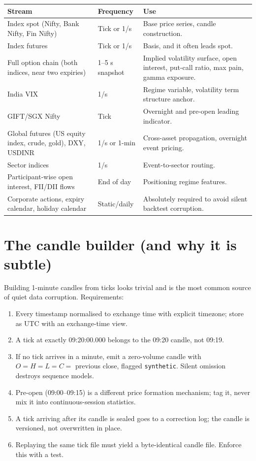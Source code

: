 \begin{longtable}{@{}p{4.0cm}p{3.2cm}p{7.0cm}@{}}
\toprule
\textbf{Stream} & \textbf{Frequency} & \textbf{Use}\\
\midrule
Index spot (Nifty, Bank Nifty, Fin Nifty) & Tick or 1/s & Base price series,
candle construction.\\
Index futures & Tick or 1/s & Basis, and it often leads spot.\\
Full option chain (both indices, near two expiries) & 1--5 s snapshot &
Implied volatility surface, open interest, put-call ratio, max pain,
gamma exposure.\\
India VIX & 1/s & Regime variable, volatility term structure anchor.\\
GIFT/SGX Nifty & Tick & Overnight and pre-open leading indicator.\\
Global futures (US equity index, crude, gold), DXY, USDINR & 1/s or 1-min &
Cross-asset propagation, overnight event pricing.\\
Sector indices & 1/s & Event-to-sector routing.\\
Participant-wise open interest, FII/DII flows & End of day & Positioning
regime features.\\
Corporate actions, expiry calendar, holiday calendar & Static/daily &
Absolutely required to avoid silent backtest corruption.\\
\bottomrule
\end{longtable}

\section{The candle builder (and why it is subtle)}

Building 1-minute candles from ticks looks trivial and is the most common source
of quiet data corruption. Requirements:

\begin{enumerate}
\item {} Every timestamp normalised to
exchange time with explicit timezone; store as UTC with an exchange-time view.
\item {} A tick at exactly 09:20:00.000
belongs to the 09:20 candle, not 09:19.
\item {} If no tick arrives in a minute, emit a
zero-volume candle with $O=H=L=C=$ previous close, flagged \texttt{synthetic}.
Silent omission destroys sequence models.
\item {} Pre-open (09:00--09:15) is a different price
formation mechanism; tag it, never mix it into continuous-session statistics.
\item {} A tick arriving after its candle is sealed goes to a
correction log; the candle is versioned, not overwritten in place.
\item {} Replaying the same tick file must yield a
byte-identical candle file. Enforce this with a test.
\end{enumerate}

